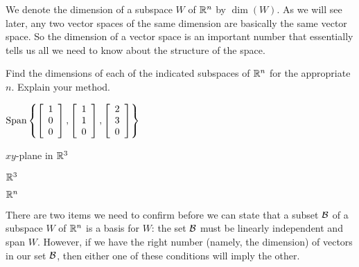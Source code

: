 We denote the dimension of a subspace $W$ of $\mathbb{R}^n$ by $\dim(W)$. As we will see later, any two vector spaces of the same dimension are basically the same vector space. So the dimension of a vector space is an important number that essentially tells us all we need to know about the structure of the space. 



\begin{activity} \label{act:3_d_2} Find the dimensions of each of the indicated subspaces of $\mathbb{R}^n$ for the appropriate $n$. Explain your method. 
	\ba

	\item $\text{Span}\left\{ \left[ \begin{array}{c} 1 \\ 0 \\ 0 \end{array} \right], \left[ \begin{array}{c} 1 \\ 1 \\ 0 \end{array} \right], \left[ \begin{array}{c} 2 \\ 3 \\ 0 \end{array} \right] \right\}$ 



	\item $xy$-plane in $\mathbb{R}^3$



	\item $\mathbb{R}^3$ 
	
	
	
	\item $\mathbb{R}^n$
	
	

	\ea
	

\end{activity}




There are two items we need to confirm before we can state that a subset $\mathcal{B}$ of a subspace $W$ of $\mathbb{R}^n$ is a basis for $W$: the set $\mathcal{B}$ must be linearly independent and span $W$. However, if we have the right number (namely, the dimension) of vectors in our set $\mathcal{B}$, then either one of these conditions will imply the other. 



